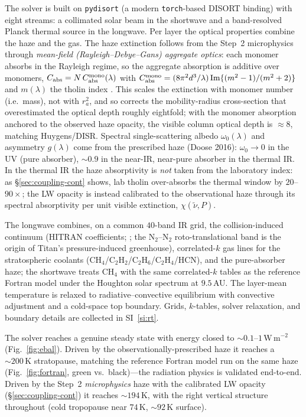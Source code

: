 \documentclass[11pt]{article}
\begin{document}
The solver is built on \texttt{pydisort} (a modern \texttt{torch}-based DISORT
binding) with eight streams: a collimated solar beam in the shortwave and a
band-resolved Planck thermal source in the longwave. Per layer the optical
properties combine the haze and the gas. The haze extinction follows from the
Step~2 microphysics through \emph{mean-field (Rayleigh--Debye--Gans) aggregate
optics}: each monomer absorbs in the Rayleigh regime, so the aggregate absorption
is additive over monomers, $C_{\rm abs}=N\,C_{\rm abs}^{\rm mono}(\lambda)$ with
$C_{\rm abs}^{\rm mono}=(8\pi^2 d^3/\lambda)\,\mathrm{Im}\{(m^2-1)/(m^2+2)\}$ and
$m(\lambda)$ the tholin index \citep{Khare1984,deTrenquelleon2025}.
This scales the extinction with monomer number (i.e.\ mass), not with $r_a^2$, and
so corrects the mobility-radius cross-section that overestimated the optical depth
roughly eightfold; with the monomer absorption anchored to the observed haze
opacity, the visible column optical depth is $\approx\!8$, matching Huygens/DISR.
Spectral single-scattering albedo $\omega_0(\lambda)$ and asymmetry $g(\lambda)$
come from the prescribed haze (Doose 2016): $\omega_0\!\to\!0$ in the UV (pure
absorber), $\sim\!0.9$ in the near-IR, near-pure absorber in the thermal IR.  In
the thermal IR the haze absorptivity is \emph{not} taken from the laboratory
index: as \S\ref{sec:coupling-cont} shows, lab tholin over-absorbs the thermal
window by $20$--$90\times$; the LW opacity is instead calibrated to the
observational haze through its spectral absorptivity per unit visible extinction,
$\chi(\tilde\nu,P)$.

The longwave combines, on a common $40$-band IR grid, the collision-induced
continuum (HITRAN coefficients; \citealp{Karman2019}; the N$_2$--N$_2$
roto-translational band is the origin of Titan's pressure-induced greenhouse),
correlated-$k$ gas lines for the stratospheric coolants
(CH$_4$/C$_2$H$_2$/C$_2$H$_6$/C$_2$H$_4$/HCN), and the pure-absorber haze; the
shortwave treats CH$_4$ with the same correlated-$k$ tables as the reference
Fortran model under the Houghton solar spectrum at $9.5$\,AU.  The layer-mean
temperature is relaxed to radiative--convective equilibrium with convective
adjustment and a cold-space top boundary.  Grids, $k$-tables, solver relaxation,
and boundary details are collected in SI~\ref{si:rt}.

The solver reaches a genuine steady state with energy closed to
$\sim\!0.1$--$1\,\mathrm{W\,m^{-2}}$ (Fig.~\ref{fig:ebal}).  Driven by the
observationally-prescribed haze it reaches a $\sim\!200\,\mathrm{K}$ stratopause,
matching the reference Fortran model run on the same haze
(Fig.~\ref{fig:fortran}, green vs.\ black)---the radiation physics is validated
end-to-end.  Driven by the Step~2 \emph{microphysics} haze with the calibrated
LW opacity (\S\ref{sec:coupling-cont}) it reaches $\sim\!194\,\mathrm{K}$, with
the right vertical structure throughout (cold tropopause near
$74\,\mathrm{K}$, $\sim\!92\,\mathrm{K}$ surface).
\end{document}
